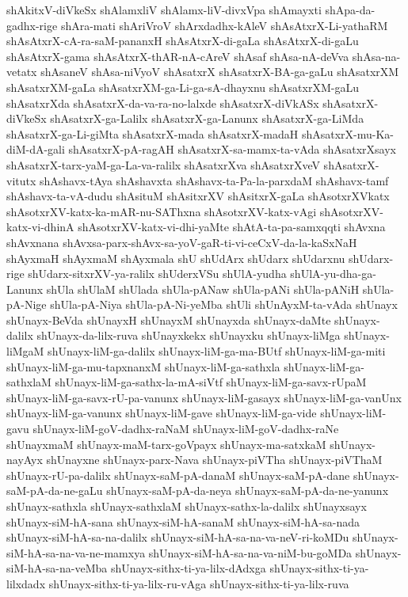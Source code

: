 {shAkitxV-diVkeSx
shAlamxliV
shAlamx-liV-divxVpa
shAmayxti
shApa-da-gadhx-rige
shAra-mati
shAriVroV
shArxdadhx-kAleV
shAsAtxrX-Li-yathaRM
shAsAtxrX-cA-ra-saM-pananxH
shAsAtxrX-di-gaLa
shAsAtxrX-di-gaLu
shAsAtxrX-gama
shAsAtxrX-thAR-nA-cAreV
shAsaf
shAsa-nA-deVva
shAsa-na-vetatx
shAsaneV
shAsa-niVyoV
shAsatxrX
shAsatxrX-BA-ga-gaLu
shAsatxrXM
shAsatxrXM-gaLa
shAsatxrXM-ga-Li-ga-sA-dhayxnu
shAsatxrXM-gaLu
shAsatxrXda
shAsatxrX-da-va-ra-no-lalxde
shAsatxrX-diVkASx
shAsatxrX-diVkeSx
shAsatxrX-ga-Lalilx
shAsatxrX-ga-Lanunx
shAsatxrX-ga-LiMda
shAsatxrX-ga-Li-giMta
shAsatxrX-mada
shAsatxrX-madaH
shAsatxrX-mu-Ka-diM-dA-gali
shAsatxrX-pA-ragAH
shAsatxrX-sa-mamx-ta-vAda
shAsatxrXsayx
shAsatxrX-tarx-yaM-ga-La-va-ralilx
shAsatxrXva
shAsatxrXveV
shAsatxrX-vitutx
shAshavx-tAya
shAshavxta
shAshavx-ta-Pa-la-parxdaM
shAshavx-tamf
shAshavx-ta-vA-dudu
shAsituM
shAsitxrXV
shAsitxrX-gaLa
shAsotxrXVkatx
shAsotxrXV-katx-ka-mAR-nu-SAThxna
shAsotxrXV-katx-vAgi
shAsotxrXV-katx-vi-dhinA
shAsotxrXV-katx-vi-dhi-yaMte
shAtA-ta-pa-samxqqti
shAvxna
shAvxnana
shAvxsa-parx-shAvx-sa-yoV-gaR-ti-vi-ceCxV-da-la-kaSxNaH
shAyxmaH
shAyxmaM
shAyxmala
shU
shUdArx
shUdarx
shUdarxnu
shUdarx-rige
shUdarx-sitxrXV-ya-ralilx
shUderxVSu
shUlA-yudha
shUlA-yu-dha-ga-Lanunx
shUla
shUlaM
shUlada
shUla-pANaw
shUla-pANi
shUla-pANiH
shUla-pA-Nige
shUla-pA-Niya
shUla-pA-Ni-yeMba
shUli
shUnAyxM-ta-vAda
shUnayx
shUnayx-BeVda
shUnayxH
shUnayxM
shUnayxda
shUnayx-daMte
shUnayx-dalilx
shUnayx-da-lilx-ruva
shUnayxkekx
shUnayxku
shUnayx-liMga
shUnayx-liMgaM
shUnayx-liM-ga-dalilx
shUnayx-liM-ga-ma-BUtf
shUnayx-liM-ga-miti
shUnayx-liM-ga-mu-tapxnanxM
shUnayx-liM-ga-sathxla
shUnayx-liM-ga-sathxlaM
shUnayx-liM-ga-sathx-la-mA-siVtf
shUnayx-liM-ga-savx-rUpaM
shUnayx-liM-ga-savx-rU-pa-vanunx
shUnayx-liM-gasayx
shUnayx-liM-ga-vanUnx
shUnayx-liM-ga-vanunx
shUnayx-liM-gave
shUnayx-liM-ga-vide
shUnayx-liM-gavu
shUnayx-liM-goV-dadhx-raNaM
shUnayx-liM-goV-dadhx-raNe
shUnayxmaM
shUnayx-maM-tarx-goVpayx
shUnayx-ma-satxkaM
shUnayx-nayAyx
shUnayxne
shUnayx-parx-Nava
shUnayx-piVTha
shUnayx-piVThaM
shUnayx-rU-pa-dalilx
shUnayx-saM-pA-danaM
shUnayx-saM-pA-dane
shUnayx-saM-pA-da-ne-gaLu
shUnayx-saM-pA-da-neya
shUnayx-saM-pA-da-ne-yanunx
shUnayx-sathxla
shUnayx-sathxlaM
shUnayx-sathx-la-dalilx
shUnayxsayx
shUnayx-siM-hA-sana
shUnayx-siM-hA-sanaM
shUnayx-siM-hA-sa-nada
shUnayx-siM-hA-sa-na-dalilx
shUnayx-siM-hA-sa-na-va-neV-ri-koMDu
shUnayx-siM-hA-sa-na-va-ne-mamxya
shUnayx-siM-hA-sa-na-va-niM-bu-goMDa
shUnayx-siM-hA-sa-na-veMba
shUnayx-sithx-ti-ya-lilx-dAdxga
shUnayx-sithx-ti-ya-lilxdadx
shUnayx-sithx-ti-ya-lilx-ru-vAga
shUnayx-sithx-ti-ya-lilx-ruva
}

